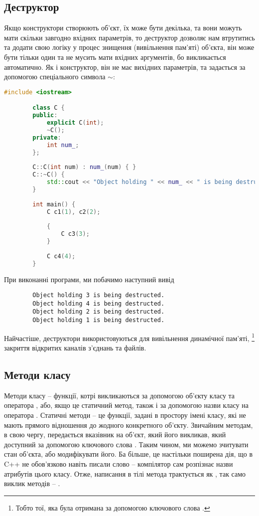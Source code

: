 \documentclass[12pt]{article}
\begin{document}
	\subsection{Деструктор}
	Якщо конструктори створюють об'єкт, їх може бути декілька, та вони можуть мати скільки завгодно вхідних параметрів, то деструктор дозволяє нам втрутитись та додати свою логіку у процес знищення (вивільнення пам'яті) об'єкта, він може бути тільки один та не мусить мати вхідних аргументів, бо викликається автоматично. Як і конструктор, він не має вихідних параметрів, та задається за допомогою спеціального символа $\sim$:
	\begin{lstlisting}[language=c++]
		#include <iostream>

		class C {
		public:
			explicit C(int);
			~C();
		private:
			int num_;
		};
		
		C::C(int num) : num_(num) { }
		C::~C() {
			std::cout << "Object holding " << num_ << " is being destructed.\n"; 
		}
		
		int main() {
			C c1(1), c2(2);
		
			{
				C c3(3);
			}
		
			C c4(4);
		}

	\end{lstlisting}
	При виконанні програми, ми побачимо наступний вивід
	\begin{lstlisting}
		Object holding 3 is being destructed.
		Object holding 4 is being destructed.
		Object holding 2 is being destructed.
		Object holding 1 is being destructed.
	\end{lstlisting}

	Найчастіше, деструктори використовуються для вивільнення динамічної пам'яті, \footnote{Тобто тої, яка була отримана за допомогою ключового слова .} закриття відкритих каналів з'єднань та файлів.

	\subsection{Методи класу}
	Методи класу -- функції, котрі викликаються за допомогою об'єкту класу та оператора , або, якщо це статичний метод, також і за допомогою назви класу на оператора \m{::}. Статичні методи -- це функції, задані в простору імені класу, які не мають прямого відношення до жодного конкретного об'єкту. Звичайним методам, в свою чергу, передається вказівник на об'єкт, який його викликав, який доступний за допомогою ключового слова . Таким чином, ми можемо зчитувати стан об'єкта, або модифікувати його. Ба більше, це настільки поширена дія, що в C++ не обов'язково навіть писали слово  -- компілятор сам розпізнає назви атрибутів цього класу. Отже, написання  в тілі метода трактується як , так само виклик методів  -- .
\end{document}
